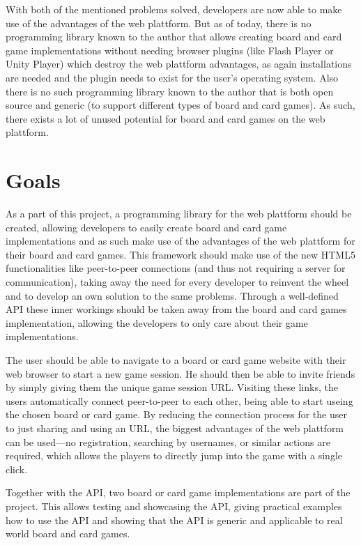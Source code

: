 With both of the mentioned problems solved, developers are now able to make use
of the advantages of the web plattform. But as of today, there is no programming
library known to the author that allows creating board and card game
implementations without needing browser plugins (like Flash Player or Unity
Player) which destroy the web plattform advantages, as again installations are
needed and the plugin needs to exist for the user's operating system. Also there
is no such programming library known to the author that is both open source and
generic (to support different types of board and card games). As such, there
exists a lot of unused potential for board and card games on the web plattform.

\section{Goals}

As a part of this project, a programming library for the web plattform should be
created, allowing developers to easily create board and card game
implementations and as such make use of the advantages of the web plattform for
their board and card games. This framework should make use of the new
\gls{HTML5} functionalities like \gls{peer-to-peer} connections (and thus not
requiring a server for communication), taking away the need for every developer
to reinvent the wheel and to develop an own solution to the same problems.
Through a well-defined \gls{API} these inner workings should be taken away from
the board and card games implementation, allowing the developers to only care
about their game implementations.

The user should be able to navigate to a board or card game website with their
web browser to start a new game session. He should then be able to invite
friends by simply giving them the unique game session URL. Visiting these links,
the users automatically connect \gls{peer-to-peer} to each other, being able to
start useing the chosen board or card game. By reducing the connection process
for the user to just sharing and using an URL, the biggest advantages of the web
plattform can be used---no registration, searching by usernames, or similar
actions are required, which allows the players to directly jump into the game
with a single click.

Together with the \gls{API}, two board or card game implementations are part of
the project. This allows testing and showcasing the \gls{API}, giving practical
examples how to use the \gls{API} and showing that the \gls{API} is generic and
applicable to real world board and card games.

